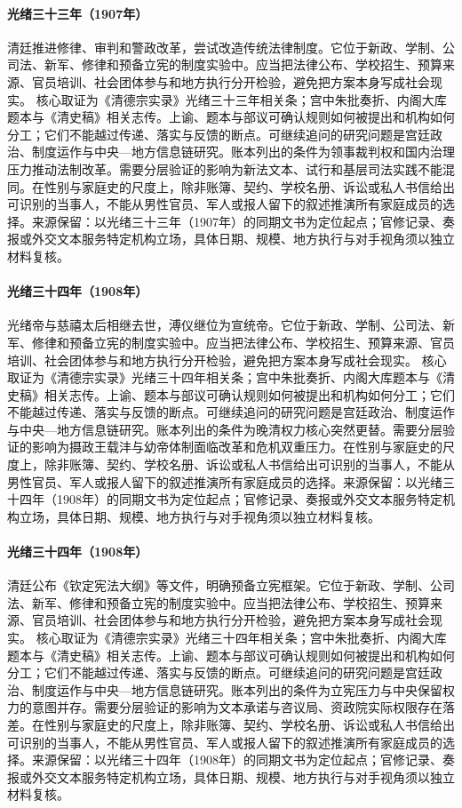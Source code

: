 \hypertarget{public:EQ-1907-QING-LEGAL-REFORM}{}\paragraph{光绪三十三年（1907年）}清廷推进修律、审判和警政改革，尝试改造传统法律制度。它位于新政、学制、公司法、新军、修律和预备立宪的制度实验中。应当把法律公布、学校招生、预算来源、官员培训、社会团体参与和地方执行分开检验，避免把方案本身写成社会现实。 核心取证为《清德宗实录》光绪三十三年相关条；宫中朱批奏折、内阁大库题本与《清史稿》相关志传。上谕、题本与部议可确认规则如何被提出和机构如何分工；它们不能越过传递、落实与反馈的断点。可继续追问的研究问题是宫廷政治、制度运作与中央—地方信息链研究。账本列出的条件为领事裁判权和国内治理压力推动法制改革。需要分层验证的影响为新法文本、试行和基层司法实践不能混同。在性别与家庭史的尺度上，除非账簿、契约、学校名册、诉讼或私人书信给出可识别的当事人，不能从男性官员、军人或报人留下的叙述推演所有家庭成员的选择。来源保留：以光绪三十三年（1907年）的同期文书为定位起点；官修记录、奏报或外交文本服务特定机构立场，具体日期、规模、地方执行与对手视角须以独立材料复核。
\hypertarget{public:EQ-1908-GUANGXU-CIXI-DEATHS}{}\paragraph{光绪三十四年（1908年）}光绪帝与慈禧太后相继去世，溥仪继位为宣统帝。它位于新政、学制、公司法、新军、修律和预备立宪的制度实验中。应当把法律公布、学校招生、预算来源、官员培训、社会团体参与和地方执行分开检验，避免把方案本身写成社会现实。 核心取证为《清德宗实录》光绪三十四年相关条；宫中朱批奏折、内阁大库题本与《清史稿》相关志传。上谕、题本与部议可确认规则如何被提出和机构如何分工；它们不能越过传递、落实与反馈的断点。可继续追问的研究问题是宫廷政治、制度运作与中央—地方信息链研究。账本列出的条件为晚清权力核心突然更替。需要分层验证的影响为摄政王载沣与幼帝体制面临改革和危机双重压力。在性别与家庭史的尺度上，除非账簿、契约、学校名册、诉讼或私人书信给出可识别的当事人，不能从男性官员、军人或报人留下的叙述推演所有家庭成员的选择。来源保留：以光绪三十四年（1908年）的同期文书为定位起点；官修记录、奏报或外交文本服务特定机构立场，具体日期、规模、地方执行与对手视角须以独立材料复核。
\hypertarget{public:EQ-1908-CONSTITUTIONAL-OUTLINE}{}\paragraph{光绪三十四年（1908年）}清廷公布《钦定宪法大纲》等文件，明确预备立宪框架。它位于新政、学制、公司法、新军、修律和预备立宪的制度实验中。应当把法律公布、学校招生、预算来源、官员培训、社会团体参与和地方执行分开检验，避免把方案本身写成社会现实。 核心取证为《清德宗实录》光绪三十四年相关条；宫中朱批奏折、内阁大库题本与《清史稿》相关志传。上谕、题本与部议可确认规则如何被提出和机构如何分工；它们不能越过传递、落实与反馈的断点。可继续追问的研究问题是宫廷政治、制度运作与中央—地方信息链研究。账本列出的条件为立宪压力与中央保留权力的意图并存。需要分层验证的影响为文本承诺与咨议局、资政院实际权限存在落差。在性别与家庭史的尺度上，除非账簿、契约、学校名册、诉讼或私人书信给出可识别的当事人，不能从男性官员、军人或报人留下的叙述推演所有家庭成员的选择。来源保留：以光绪三十四年（1908年）的同期文书为定位起点；官修记录、奏报或外交文本服务特定机构立场，具体日期、规模、地方执行与对手视角须以独立材料复核。
